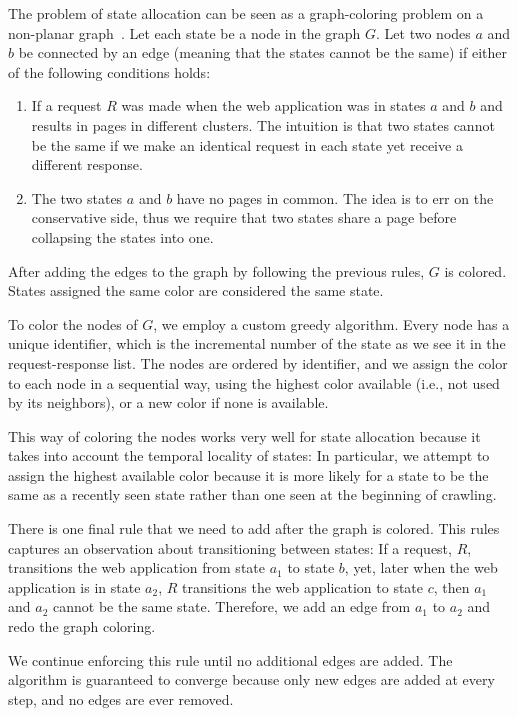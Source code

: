 The problem of state allocation can be seen as a graph-coloring problem on a
non-planar graph~\cite{jensen94:graph}. Let each state be a node in the graph
$G$. Let two nodes $a$ and $b$ be connected by an edge (meaning that the
states cannot be the same) if either of the
following conditions holds:
\begin{enumerate}
 \item If a request $R$ was made when the web application was in states $a$ and
   $b$ and results in pages in different clusters. The intuition is that two
   states cannot be the same if we make an identical request in each state yet
   receive a different response.
 \item The two states $a$ and $b$ have no pages in common. The idea is to err
   on the conservative side, thus we require that two states share a page
   before collapsing the states into one.
\end{enumerate}

After adding the edges to the graph by following the previous rules, $G$ is
colored. States assigned the same color are considered the same state.

To color the nodes of $G$, we employ a custom greedy algorithm. Every node has a
unique identifier, which is the incremental number of the state as we see it in
the request-response list. The nodes are ordered by identifier, and we assign the color to
each node in a sequential way, using the highest color available (i.e., not
used by its neighbors), or a new color if none is available.

This way of coloring the nodes works very well for state allocation because it
takes into account the temporal locality of states: In particular, we attempt to
assign the highest available color because it is more likely for a state to be
the same as a recently seen state rather than one seen at the beginning of
crawling.

There is one final rule that we need to add after the graph is colored. This
rules captures an observation about transitioning between states: If a request,
$R$, transitions the web application from state $a_1$ to state $b$, yet, later
when the web application is in state $a_2$, $R$ transitions the web application
to state $c$, then $a_1$ and $a_2$ cannot be the same state. Therefore, we add
an edge from $a_1$ to $a_2$ and redo the graph coloring.

We continue enforcing this rule until no additional edges are added. The
algorithm is guaranteed to converge because only new edges are added at every
step, and no edges are ever removed. 

